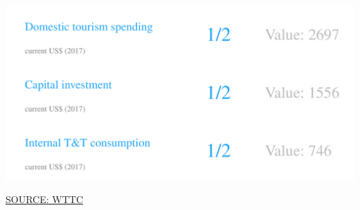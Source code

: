 \documentclass{article}\usepackage[]{graphicx}\usepackage[]{color}
\makeatletter
\def\maxwidth{ %
  \ifdim\Gin@nat@width>\linewidth
    \linewidth
  \else
    \Gin@nat@width
  \fi
}
\makeatother
\begin{document}
\begin{minipage}[c]{0.95\textwidth}
\begin{minipage}[c]{0.5\textwidth}
{\centering \includegraphics[width=\maxwidth]{figure/number2_1-1} 

}



    \hspace{4ex}\scriptsize{\href{NA}{\textcolor[HTML]{FF4023}{SOURCE: WTTC}}}
  \end{minipage}
\end{minipage}      
\end{document}
